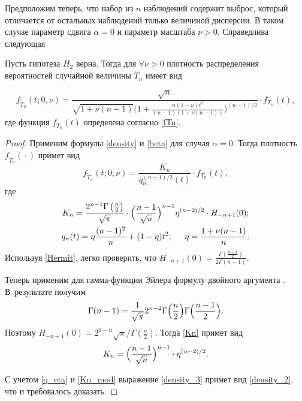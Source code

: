 Предположим теперь, что набор из $n$ наблюдений содержит выброс, который отличается от остальных наблюдений  только величиной дисперсии. В таком случае
параметр сдвига $\alpha=0$ и параметр масштаба $\nu>0$. Справедлива следующая

\smallskip

\begin{theorem}[1]Пусть гипотеза $H_2$ верна{\rm.}
Тогда для $\forall \nu>0$ плотность распределения вероятностей случайной величины $\widetilde{T}_n$ имеет вид

\begin{equation}
\label{density_2}
f_{\widetilde{T}_n}(t;0,\nu)= \frac{\sqrt{n}}{\sqrt{1+\nu(n-1)}\bigl(1+\frac{n(1-\nu)t^2}{(n-1)(1+\nu(n-1))}\bigr)^{({n-1})/{2}}}\cdot f_{T_n}(t),
\end{equation}
где функция $f_{T_n}(t)$ определена согласно \rm \eqref{fTn}.
\end{theorem}

\smallskip

\begin{proof}
Применим формулы \eqref{density} и \eqref{beta} для случая $\alpha=0$. 
Тогда плотность $f_{\widetilde{T}_n}({}\cdot{})$ примет вид
\begin{equation}
\label{density_3}
f_{\widetilde{T}_n}(t;0,\nu)= \frac{K_n}{q^{({n-1})/{2}}_n(t)}\cdot f_{T_n}(t),
\end{equation}
где
\begin{gather}
\label{Kn}
K_n=\frac{2^{n-1}\Gamma\left(\frac{n}{2}\right)}{\sqrt{\pi}}\cdot 
\Bigl(\frac{n-1}{\sqrt{n}}\Bigr)^{n-1}\eta^{({n-2})/{2}}\cdot
H_{-n+1}(0);
\\
\label{q_eta}
q_n(t)= \eta\frac{(n-1)^2}{n}+(1-\eta)t^2;\hspace{5mm} \eta=\frac{1+\nu(n-1)}{n}.
\end{gather}
Используя  \eqref{Hermit}, легко проверить, что $H_{-n+1}(0)=\frac{\Gamma\left(\frac{n-1}{2}\right)}{2\Gamma(n-1)}.$


Теперь применим для гамма-функции Эйлера формулу двойного аргумента \cite[с.~53]{Yanke}.
В~результате получим
$$
\Gamma(n-1)=\frac{1}{\sqrt{\pi}}2^{n-2}\Gamma\Bigl(\frac{n}{2}\Bigr)\Gamma\Bigr(\frac{n-1}{2}\Bigr).
$$
Поэтому $H_{-n+1}(0)=2^{1-n}\sqrt{\pi}/\Gamma\left(\frac{n}{2}\right).$
Тогда  \eqref{Kn} примет вид
\begin{equation}
\label{Kn_mod}
K_n=\Bigl(\frac{n-1}{\sqrt{n}}\Bigr)^{n-1}\cdot\eta^{({n-2})/{2}}.
\end{equation}

 С учетом \eqref{q_eta}  и  \eqref{Kn_mod}  выражение   \eqref{density_3}  примет вид  \eqref{density_2}, что и требовалось доказать.  \hfill  \end{proof}
 
